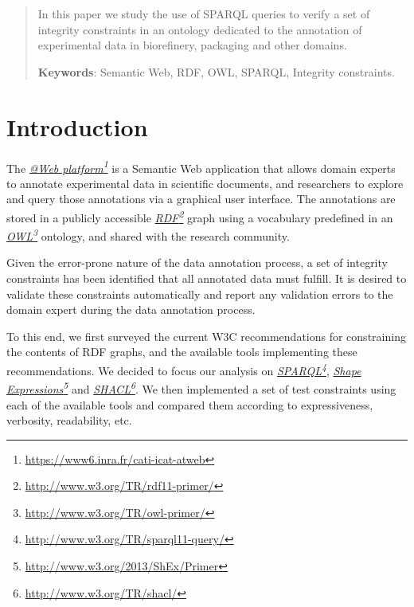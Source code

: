 \documentclass[a4paper, 10pt]{article}
\newcommand{\fnhref}[2]{\href{#2}{#1}\footnote{\url{#2}}}
\newcommand{\ifnhref}[2]{\textit{\fnhref{#1}{#2}}}
\begin{document}
\begin{abstract}
  In this paper we study the use of SPARQL queries to verify a set of integrity
  constraints in an ontology dedicated to the annotation of experimental data
  in biorefinery, packaging and other domains.

  \vspace{1em}

  \textbf{Keywords}: Semantic Web, RDF, OWL, SPARQL, Integrity constraints.
\end{abstract}

\section{Introduction}
\label{sec:introduction}

The \ifnhref{@Web platform}{https://www6.inra.fr/cati-icat-atweb} is a Semantic
Web application that allows domain experts to annotate experimental data in
scientific documents, and researchers to explore and query those annotations
via a graphical user interface. The annotations are stored in a publicly
accessible \ifnhref{RDF}{http://www.w3.org/TR/rdf11-primer/} graph using a
vocabulary predefined in an \ifnhref{OWL}{http://www.w3.org/TR/owl-primer/}
ontology, and shared with the research community.

Given the error-prone nature of the data annotation process, a set of integrity
constraints has been identified that all annotated data must fulfill. It is
desired to validate these constraints automatically and report any validation
errors to the domain expert during the data annotation process.

To this end, we first surveyed the current W3C recommendations for constraining
the contents of RDF graphs, and the available tools implementing these
recommendations. We decided to focus our analysis on
\ifnhref{SPARQL}{http://www.w3.org/TR/sparql11-query/}, \ifnhref{Shape
Expressions}{http://www.w3.org/2013/ShEx/Primer} and
\ifnhref{SHACL}{http://www.w3.org/TR/shacl/}. We then implemented a set of test
constraints using each of the available tools and compared them according to
expressiveness, verbosity, readability, etc.
\end{document}
